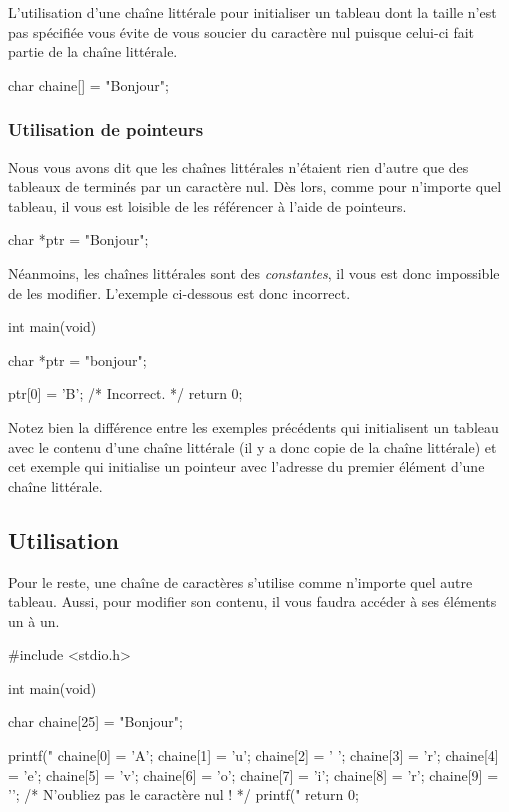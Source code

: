 L'utilisation d'une chaîne littérale pour initialiser un tableau dont la
taille n'est pas spécifiée vous évite de vous soucier du caractère nul
puisque celui-ci fait partie de la chaîne littérale.

\begin{C}
char chaine[] = "Bonjour";
\end{C}

\subsubsection{Utilisation de pointeurs}
\label{utilisation-de-pointeurs}

Nous vous avons dit que les chaînes littérales n'étaient rien d'autre
que des tableaux de  terminés par un caractère nul. Dès
lors, comme pour n'importe quel tableau, il vous est loisible de les
référencer à l'aide de pointeurs.

\begin{C}
char *ptr = "Bonjour";
\end{C}

Néanmoins, les chaînes littérales sont des \emph{constantes}, il vous
est donc impossible de les modifier. L'exemple ci-dessous est donc
incorrect.

\begin{C}
int main(void)
{
    char *ptr = "bonjour";

    ptr[0] = 'B'; /* Incorrect. */
    return 0;
}
\end{C}

\begin{attentionbox}
  Notez bien la différence entre les
exemples précédents qui initialisent un tableau avec le contenu d'une
chaîne littérale (il y a donc copie de la chaîne littérale) et cet
exemple qui initialise un pointeur avec l'adresse du premier élément
d'une chaîne littérale.
\end{attentionbox}


\subsection{Utilisation}
\label{utilisation-1}

Pour le reste, une chaîne de caractères s'utilise comme n'importe quel
autre tableau. Aussi, pour modifier son contenu, il vous faudra accéder
à ses éléments un à un.

\begin{C}
#include <stdio.h>


int main(void)
{
    char chaine[25] = "Bonjour";

    printf("%
    chaine[0] = 'A';
    chaine[1] = 'u';
    chaine[2] = ' ';
    chaine[3] = 'r';
    chaine[4] = 'e';
    chaine[5] = 'v';
    chaine[6] = 'o';
    chaine[7] = 'i';
    chaine[8] = 'r';
    chaine[9] = '\0'; /* N'oubliez pas le caractère nul ! */
    printf("%
    return 0;
}
\end{C}

